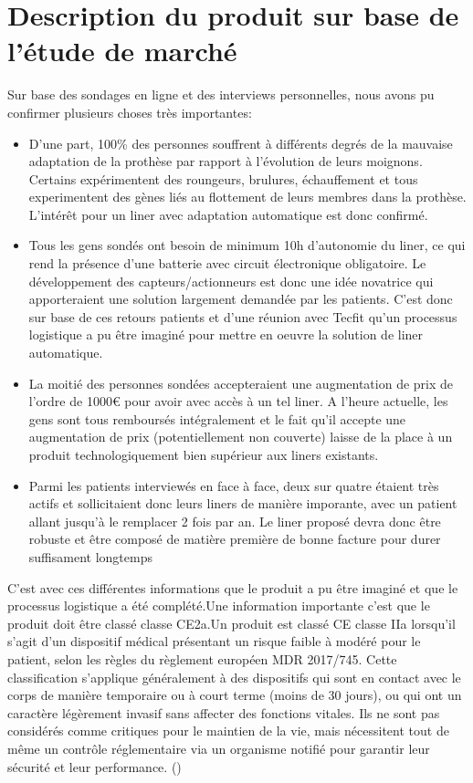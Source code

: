 \section{Description du produit sur base de l'étude de marché}

Sur base des sondages en ligne et des interviews personnelles, nous avons pu confirmer plusieurs choses très importantes:

\begin{itemize}
    \item D'une part, 100\% des personnes souffrent à différents degrés de la mauvaise adaptation de la prothèse par rapport à l'évolution de leurs moignons. Certains expérimentent des roungeurs, brulures, échauffement et tous experimentent des gènes liés au flottement de leurs membres dans la prothèse. L'intérêt pour un liner avec adaptation automatique est donc confirmé.
    \item Tous les gens sondés ont besoin de minimum 10h d'autonomie du liner, ce qui rend la présence d'une batterie avec circuit électronique obligatoire. Le développement des capteurs/actionneurs est donc une idée novatrice qui apporteraient une solution largement demandée par les patients. C'est donc sur base de ces retours patients et d'une réunion avec Tecfit qu'un processus logistique a pu être imaginé pour mettre en oeuvre la solution de liner automatique.
    \item La moitié des personnes sondées accepteraient une augmentation de prix de l'ordre de 1000€ pour avoir avec accès à un tel liner. A l'heure actuelle, les gens sont tous remboursés intégralement et le fait qu'il accepte une augmentation de prix (potentiellement non couverte) laisse de la place à un produit  technologiquement bien supérieur aux liners existants.
    \item Parmi les patients interviewés en face à face, deux sur quatre étaient très actifs et sollicitaient donc leurs liners de manière imporante, avec un patient allant jusqu'à le remplacer 2 fois par an. Le liner proposé devra donc être robuste et être composé de matière première de bonne facture pour durer suffisament longtemps
  
\end{itemize}

C'est avec ces différentes informations que le produit a pu être imaginé et que le processus logistique a été complété.Une information importante c'est que le produit doit être classé classe CE2a.Un produit est classé CE classe IIa lorsqu’il s’agit d’un dispositif médical présentant un risque faible à modéré pour le patient, selon les règles du règlement européen MDR 2017/745. Cette classification s’applique généralement à des dispositifs qui sont en contact avec le corps de manière temporaire ou à court terme (moins de 30 jours), ou qui ont un caractère légèrement invasif sans affecter des fonctions vitales. Ils ne sont pas considérés comme critiques pour le maintien de la vie, mais nécessitent tout de même un contrôle réglementaire via un organisme notifié pour garantir leur sécurité et leur performance. (\cite{ref:ce-classe})  


